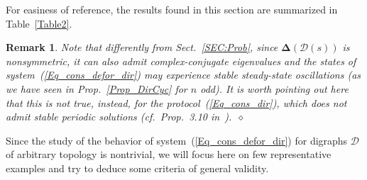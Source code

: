 \documentclass[letterpaper,9pt,twocolumn]{autart}
\newtheorem{remark}{\textbf{Remark}}
\begin{document}
For easiness of reference, the results found in this section are summarized in Table~\ref{Table2}.
\begin{remark}
Note that differently from Sect.~\ref{SEC:Prob}, since
$\boldsymbol{\Delta}(\mathcal{D}(s))$ is nonsymmetric,
it can also admit \emph{complex-conjugate eigenvalues} and the states
of system~(\ref{Eq_cons_defor_dir}) 
may experience stable steady-state oscillations (as we have seen
in Prop.~\ref{Prop_DirCyc} for $n$ odd). It is worth pointing out here
that this is not true, instead, for the protocol~(\ref{Eq_cons_dir}), 
which does not admit stable periodic solutions
(cf.~Prop.~3.10 in~\cite{MesbahiEg_book10}).~\hfill$\diamond$
\end{remark}
Since the study of the behavior of system~(\ref{Eq_cons_defor_dir}) for digraphs
$\mathcal{D}$ of arbitrary topology is nontrivial, we will focus here 
on few representative examples and try to deduce some criteria of
general validity.
\end{document}
